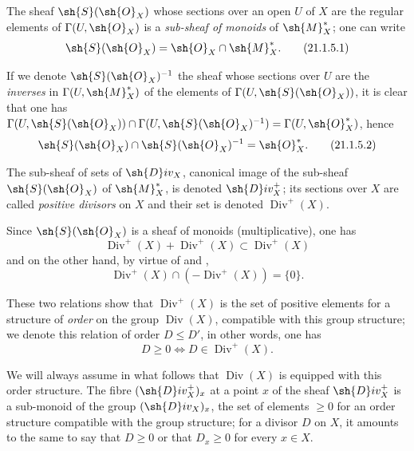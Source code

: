 \begin{env}[21.1.5]
\label{IV.21.1.5}
The sheaf $\sh{S}(\sh{O}_X)$  whose sections over an open $U$ of $X$ are the regular elements of $\Gamma(U,\sh{O}_X)$ is a \emph{sub-sheaf of monoids} of $\sh{M}_X^*$;
one can write
\[
\label{IV.21.1.5.1}
  \sh{S}(\sh{O}_X)=\sh{O}_X\cap\sh{M}_X^*.
  \tag{21.1.5.1}
\]

If we denote $\sh{S}(\sh{O}_X)^{-1}$ the sheaf whose sections over $U$ are the \emph{inverses} in $\Gamma(U,\sh{M}_X^*)$ of the elements of $\Gamma(U,\sh{S}(\sh{O}_X))$, it is clear that one has $\Gamma(U,\sh{S}(\sh{O}_X))\cap\Gamma(U,\sh{S}(\sh{O}_X)^{-1})=\Gamma(U,\sh{O}_X^*)$, hence
\[
\label{IV.21.1.5.2}
  \sh{S}(\sh{O}_X)\cap\sh{S}(\sh{O}_X)^{-1}=\sh{O}_X^*.
  \tag{21.1.5.2}
\]
\end{env}

\begin{definition}[21.1.6]
\label{IV.21.1.6}
The sub-sheaf of sets of $\sh{D}iv_X$, canonical image of the sub-sheaf $\sh{S}(\sh{O}_X)$ of $\sh{M}_X^*$, is denoted $\sh{D}iv_X^+$;
its sections over $X$ are called \emph{positive divisors} on $X$ and their set is denoted $\operatorname{Div}^+(X)$.
\end{definition}

Since $\sh{S}(\sh{O}_X)$ is a sheaf of monoids (multiplicative), one has
\[
\label{IV.21.1.6.1}
  \operatorname{Div}^+(X)+\operatorname{Div}^+(X)\subset\operatorname{Div}^+(X)
  \tag{21.1.6.1}
\]
and on the other hand, by virtue of  and ,
\[
\label{IV.21.1.6.2}
  \operatorname{Div}^+(X)\cap(-\operatorname{Div}^+(X))=\{0\}.
  \tag{21.1.6.2}
\]

These two relations show that $\operatorname{Div}^+(X)$ is the set of positive elements for a structure of \emph{order} on the group $\operatorname{Div}(X)$, compatible with this group structure;
we denote this relation of order $D\leq D'$, in other words, one has
\[
\label{IV.21.1.6.3}
  D\geq 0\iff D\in\operatorname{Div}^+(X).
  \tag{21.1.6.3}
\]

We will always assume in what follows that $\operatorname{Div}(X)$ is equipped with this order structure.
The fibre $(\sh{D}iv_X^+)_x$ at a point $x$ of the sheaf $\sh{D}iv_X^+$ is a sub-monoid of the group $(\sh{D}iv_X)_x$, the set of elements $\geq 0$ for an order structure compatible with the group structure;
for a divisor $D$ on $X$, it amounts to the same to say that $D\geq 0$ or that $D_x\geq 0$ for every $x\in X$.

